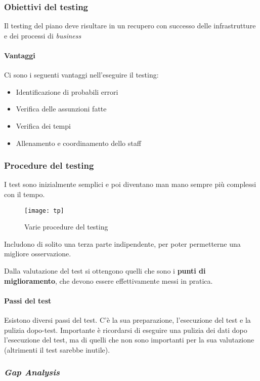 \subsubsection{Obiettivi del testing}

Il testing del piano deve risultare in un recupero con successo delle 
infrastrutture e dei processi di \textit{business}

\paragraph*{Vantaggi} Ci sono i seguenti vantaggi nell'eseguire il testing:
\begin{itemize}
  \item Identificazione di probabili errori
  \item Verifica delle assunzioni fatte
  \item Verifica dei tempi
  \item Allenamento e coordinamento dello staff
\end{itemize}

\subsubsection{Procedure del testing}

I test sono inizialmente semplici e poi diventano man mano sempre più complessi 
con il tempo.


\begin{figure}[H]
 \centering
 \texttt{[image: tp]}
 \caption{Varie procedure del testing}
\end{figure}

Includono di solito una terza parte indipendente, per poter permetterne una 
migliore osservazione.

Dalla valutazione del test si ottengono quelli che sono i \textbf{punti di 
miglioramento}, che devono essere effettivamente messi in pratica.

\paragraph*{Passi del test} Esistono diversi passi del test. C'è la sua 
preparazione, l'esecuzione del test e la pulizia dopo-test. Importante è 
ricordarsi di eseguire una pulizia dei dati dopo l'esecuzione del test, ma di 
quelli che non sono importanti per la sua valutazione (altrimenti il test 
sarebbe inutile).

\subsubsection{\textit{Gap Analysis}}

